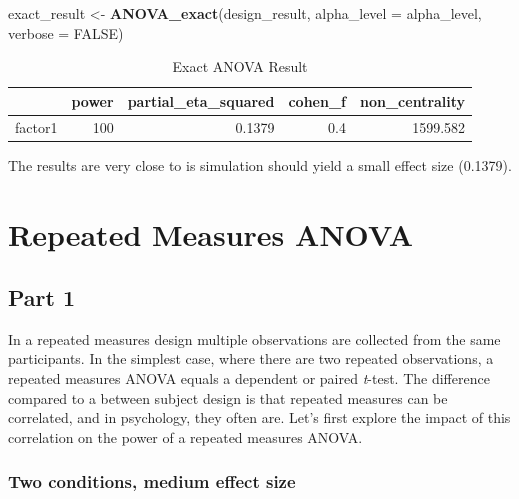 \documentclass[]{book}
\newenvironment{Shaded}{\begin{snugshade}}{\end{snugshade}}
\newcommand{\DataTypeTok}[1]{\textcolor[rgb]{0.13,0.29,0.53}{#1}}
\newcommand{\KeywordTok}[1]{\textcolor[rgb]{0.13,0.29,0.53}{\textbf{#1}}}
\newcommand{\NormalTok}[1]{#1}
\newcommand{\OtherTok}[1]{\textcolor[rgb]{0.56,0.35,0.01}{#1}}
\newcommand{\StringTok}[1]{\textcolor[rgb]{0.31,0.60,0.02}{#1}}
\begin{document}
\begin{Shaded}
\begin{Highlighting}[]
\NormalTok{exact_result <-}\StringTok{ }\KeywordTok{ANOVA_exact}\NormalTok{(design_result,}
                            \DataTypeTok{alpha_level =}\NormalTok{ alpha_level,}
                            \DataTypeTok{verbose =} \OtherTok{FALSE}\NormalTok{)}
\end{Highlighting}
\end{Shaded}

\begin{table}[t]

\caption{\label{tab:unnamed-chunk-92}Exact ANOVA Result}
\centering
\begin{tabular}{l|r|r|r|r}
\hline
  & power & partial\_eta\_squared & cohen\_f & non\_centrality\\
\hline
factor1 & 100 & 0.1379 & 0.4 & 1599.582\\
\hline
\end{tabular}
\end{table}

The results are very close to is simulation should yield a small effect size (0.1379).

\hypertarget{repeated-measures-anova}{%
\chapter{Repeated Measures ANOVA}\label{repeated-measures-anova}}

\hypertarget{part-1-1}{%
\section{Part 1}\label{part-1-1}}

In a repeated measures design multiple observations are collected from the same participants. In the simplest case, where there are two repeated observations, a repeated measures ANOVA equals a dependent or paired \emph{t}-test. The difference compared to a between subject design is that repeated measures can be correlated, and in psychology, they often are. Let's first explore the impact of this correlation on the power of a repeated measures ANOVA.

\hypertarget{two-conditions-medium-effect-size}{%
\subsection{Two conditions, medium effect size}\label{two-conditions-medium-effect-size}}
\end{document}
